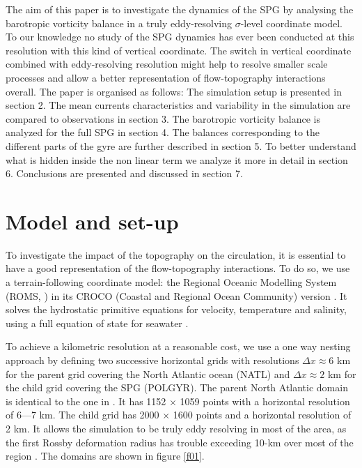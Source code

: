 \documentclass[os, manuscript]{copernicus}
\begin{document}
The aim of this paper is to investigate the dynamics of the SPG by analysing the barotropic vorticity balance in a truly eddy-resolving $\sigma$-level coordinate model. To our knowledge no study of the SPG dynamics has ever been conducted at this resolution with this kind of vertical coordinate. The switch in vertical coordinate combined with eddy-resolving resolution might help to resolve smaller scale processes and allow a better representation of flow-topography interactions overall. The paper is organised as follows: The simulation setup is presented in section 2. The mean currents characteristics and variability in the simulation are compared to observations in section 3. The barotropic vorticity balance is analyzed for the full SPG in section 4. The balances corresponding to the different parts of the gyre are further described in section 5. To better understand what is hidden inside the non linear term we analyze it more in detail in section 6. Conclusions are presented and discussed in section 7.  

\section{Model and set-up}
To investigate the impact of the topography on the circulation, it is essential to have a good representation of the flow-topography interactions. To do so, we use a terrain-following coordinate model: the Regional Oceanic Modelling System (ROMS, \citet{shchepetkin2009}) in its CROCO (Coastal and Regional Ocean Community) version \citep{debreu2012}. It solves the hydrostatic primitive equations for velocity, temperature and salinity, using a full equation of state for seawater \citep{shchepetkin2009,shchepetkin2011}. 

To achieve a kilometric resolution at a reasonable cost, we use a one way nesting approach by defining two successive horizontal grids with resolutions $\Delta x \approx 6$ km for the parent grid covering the North Atlantic ocean (NATL) and $\Delta x \approx 2$ km for the child grid covering the SPG (POLGYR). The parent North Atlantic domain is identical to the one in \cite{renault2016}. It has 1152 $\times$ 1059 points  with a horizontal resolution of 6---7 km. The child grid has 2000 $\times$ 1600 points and a horizontal resolution of 2 km. It allows the simulation to be truly eddy resolving in most of the area, as the first Rossby deformation radius has trouble exceeding 10-km over most of the region \citep{chelton1998}. The domains are shown in figure \ref{f01}. 
\end{document}
